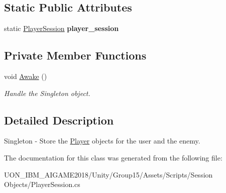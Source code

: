 \subsection*{Static Public Attributes}
\begin{DoxyCompactItemize}
\item 
\mbox{\label{class_player_session_acc6317b2b33507b267fc204419aa3ab9}} 
static \mbox{\hyperlink{class_player_session}{Player\+Session}} {\bfseries player\+\_\+session}
\end{DoxyCompactItemize}
\subsection*{Private Member Functions}
\begin{DoxyCompactItemize}
\item 
\mbox{\label{class_player_session_a5f382c3a86c0042bfad86f54299bb119}} 
void \mbox{\hyperlink{class_player_session_a5f382c3a86c0042bfad86f54299bb119}{Awake}} ()
\begin{DoxyCompactList}\small\item\em Handle the Singleton object. \end{DoxyCompactList}\end{DoxyCompactItemize}


\subsection{Detailed Description}
Singleton -\/ Store the \mbox{\hyperlink{class_player}{Player}} objects for the user and the enemy. 

The documentation for this class was generated from the following file\+:\begin{DoxyCompactItemize}
\item 
U\+O\+N\+\_\+\+I\+B\+M\+\_\+\+A\+I\+G\+A\+M\+E2018/\+Unity/\+Group15/\+Assets/\+Scripts/\+Session Objects/Player\+Session.\+cs\end{DoxyCompactItemize}
